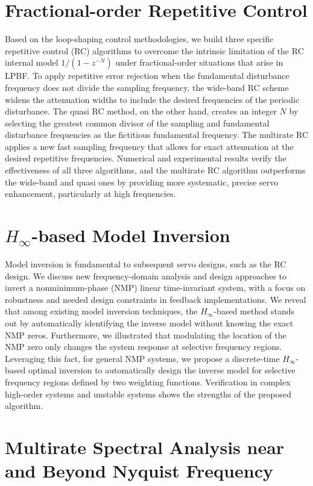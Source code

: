 \documentclass [11pt, proquest] {uwthesis}[2020/02/24]
\begin{document}
\section*{Fractional-order Repetitive Control}

Based on the loop-shaping control methodologies, we build three specific repetitive control (RC) algorithms to overcome the intrinsic limitation of the RC internal model $1/(1-z^{-N})$
under fractional-order situations that arise in LPBF. To apply repetitive error rejection when the
fundamental disturbance frequency does not divide the sampling frequency,
the wide-band RC scheme widens the attenuation widths to include the
desired frequencies of the periodic disturbance. The quasi RC method,
on the other hand, creates an integer $N$ by selecting the greatest
common divisor of the sampling and fundamental disturbance frequencies
as the fictitious fundamental frequency. The multirate RC applies
a new fast sampling frequency that allows for exact attenuation at
the desired repetitive frequencies. Numerical and experimental results
verify the effectiveness of all three algorithms, and the multirate
RC algorithm outperforms the wide-band and quasi ones by providing
more systematic, precise servo enhancement, particularly at high frequencies.

\section*{$H_\infty$-based Model Inversion}

Model inversion is fundamental to subsequent servo designs, such as the RC design. We discuss new frequency-domain analysis and design
approaches to invert a nonminimum-phase (NMP) linear time-invariant
system, with a focus on robustness and needed design constraints in
feedback implementations. We reveal that among existing model inversion
techniques, the $H_{\infty}$-based method stands out by automatically
identifying the inverse model without knowing the exact NMP zeros.
Furthermore, we illustrated that modulating the location of the NMP
zero only changes the system response at selective frequency regions.
Leveraging this fact, for general NMP systems, we propose a discrete-time
$H_{\infty}$-based optimal inversion to automatically design the
inverse model for selective frequency regions defined by two weighting
functions. Verification in complex high-order systems and unstable
systems shows the strengths of the proposed algorithm.

\section*{Multirate Spectral Analysis near and Beyond Nyquist Frequency}
\end{document}
